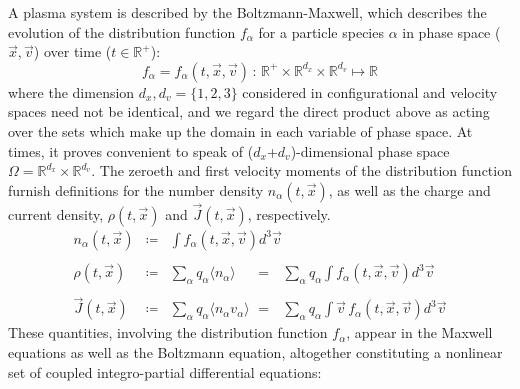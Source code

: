\documentclass[11pt,titlepage]{report}
\begin{document}
\indent \indent A plasma system is described by the Boltzmann-Maxwell, which describes the evolution of the distribution function $f_{\alpha}$ for a particle species $\alpha$ in phase space ($\vec{x},\vec{v}$) over time ($t\in\mathbb{R^+}$):
$$f_{\alpha} = f_{\alpha}(t,\vec{x},\vec{v}) \, : \, \mathbb{R}^+ \times \mathbb{R}^{d_x} \times \mathbb{R}^{d_v} \mapsto \mathbb{R}$$
\noindent where the dimension $d_x,d_v = \{1,2,3\}$ considered in configurational and velocity spaces need not be identical, and we regard the direct product above as acting over the sets which make up the domain in each variable of phase space. At times, it proves convenient to speak of ($d_x$+$d_v$)-dimensional phase space $\Omega = \mathbb{R}^{d_x} \times \mathbb{R}^{d_v}$. The zeroeth and first velocity moments of the distribution function furnish definitions for the number density $n_{\alpha}(t,\vec{x})$, as well as the charge and current density, $\rho (t,\vec{x})$ and $\vec{J}(t,\vec{x})$, respectively.
\begin{eqnarray}
n_{\alpha}(t,\vec{x}) & \coloneqq & \int f_{\alpha}(t,\vec{x},\vec{v})d^3\vec{v}\\
&&\nonumber\\
\rho (t,\vec{x}) & \coloneqq & \sum_{\alpha} q_{\alpha} \langle n_{\alpha}\rangle\quad\,\, = \,\,\,\,\sum_{\alpha} q_{\alpha}\int f_{\alpha}(t,\vec{x},\vec{v}) d^3\vec{v} \\
&&\nonumber\\
\vec{J}(t,\vec{x}) & \coloneqq & \sum_{\alpha} q_{\alpha}\langle n_{\alpha} v_{\alpha}\rangle\,\,  =\,\,\,\, \sum_{\alpha} q_{\alpha} \int \vec{v}\,f_{\alpha}(t,\vec{x},\vec{v}) d^3\vec{v}
\end{eqnarray}
\noindent These quantities, involving the distribution function $f_{\alpha}$, appear in the Maxwell equations as well as the Boltzmann equation, altogether constituting a nonlinear set of coupled integro-partial differential equations:
\end{document}
